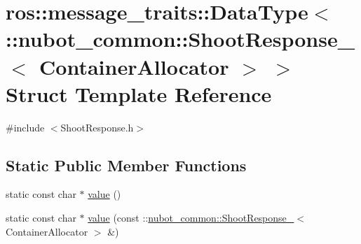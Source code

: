 \hypertarget{structros_1_1message__traits_1_1DataType_3_01_1_1nubot__common_1_1ShootResponse___3_01ContainerAllocator_01_4_01_4}{\section{ros\-:\-:message\-\_\-traits\-:\-:Data\-Type$<$ \-:\-:nubot\-\_\-common\-:\-:Shoot\-Response\-\_\-$<$ Container\-Allocator $>$ $>$ Struct Template Reference}
\label{structros_1_1message__traits_1_1DataType_3_01_1_1nubot__common_1_1ShootResponse___3_01ContainerAllocator_01_4_01_4}
}


{\ttfamily \#include $<$Shoot\-Response.\-h$>$}

\subsection*{Static Public Member Functions}
\begin{DoxyCompactItemize}
\item 
static const char $\ast$ \hyperlink{structros_1_1message__traits_1_1DataType_3_01_1_1nubot__common_1_1ShootResponse___3_01ContainerAllocator_01_4_01_4_a691733f486cc999b9a7164f38cd48b92}{value} ()
\item 
static const char $\ast$ \hyperlink{structros_1_1message__traits_1_1DataType_3_01_1_1nubot__common_1_1ShootResponse___3_01ContainerAllocator_01_4_01_4_a18510d10a33a8c23739dbef08cb6783c}{value} (const \-::\hyperlink{structnubot__common_1_1ShootResponse__}{nubot\-\_\-common\-::\-Shoot\-Response\-\_\-}$<$ Container\-Allocator $>$ \&)
\end{DoxyCompactItemize}


